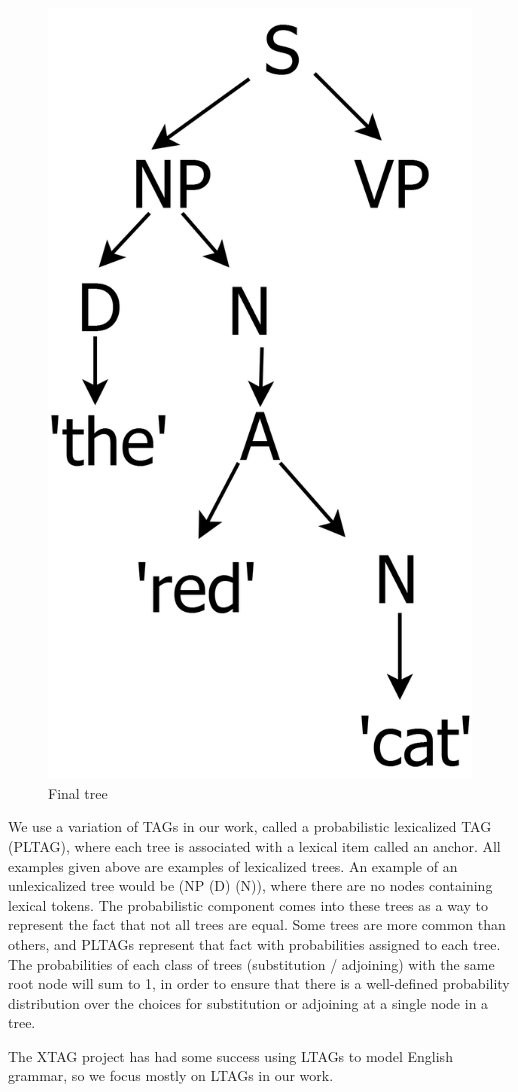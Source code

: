 \begin{figure}[ht]
\begin{minipage}[b]{0.3\linewidth}
\includegraphics[width=\linewidth]{tree-3.png}
\caption{Final tree}
\label{tree-3}
\end{minipage}
\end{figure}

We use a variation of TAGs in our work, called a probabilistic lexicalized TAG (PLTAG), where each tree is
associated with a lexical item called an anchor.  All examples given above are examples of
lexicalized trees.  An example of an unlexicalized tree would be (NP (D) (N)), where there
are no nodes containing lexical tokens.  The probabilistic component comes into these trees
as a way to represent the fact that not all trees are equal.  Some trees are more common
than others, and PLTAGs represent that fact with probabilities assigned to each tree.
The probabilities of each class of trees (substitution / adjoining) with the same root node
will sum to 1, in order to ensure that there is a well-defined probability distribution
over the choices for substitution or adjoining at a single node in a tree.

The XTAG project has had some success using LTAGs to model English grammar\cite{xtag}, 
so we focus mostly on LTAGs in our work.